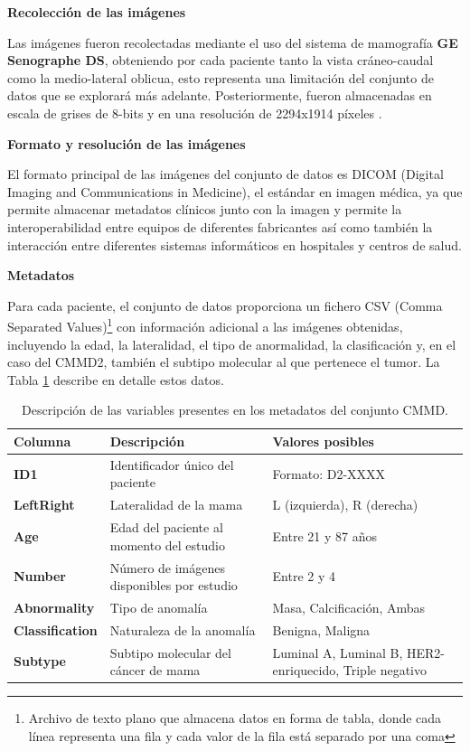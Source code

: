 \documentclass[a4paper,10pt]{book}
\begin{document}
\textbf{Recolección de las imágenes}

Las imágenes fueron recolectadas mediante el uso del sistema de mamografía \textbf{GE Senographe DS}, obteniendo por cada paciente tanto la vista cráneo-caudal como la medio-lateral oblicua, esto representa una limitación del conjunto de datos que se explorará más adelante. Posteriormente, fueron almacenadas en escala de grises de 8-bits y en una resolución de 2294x1914 píxeles \cite{cai_online_2023}.

\textbf{Formato y resolución de las imágenes}

El formato principal de las imágenes del conjunto de datos es DICOM (Digital Imaging and Communications in Medicine), el estándar en imagen médica, ya que permite almacenar metadatos clínicos junto con la imagen y permite la interoperabilidad entre equipos de diferentes fabricantes así como también la interacción entre diferentes sistemas informáticos en hospitales y centros de salud.

\textbf{Metadatos}

Para cada paciente, el conjunto de datos proporciona un fichero CSV (Comma Separated Values)\footnote{Archivo de texto plano que almacena datos en forma de tabla, donde cada línea representa una fila y cada valor de la fila está separado por una coma} con información adicional a las imágenes obtenidas, incluyendo la edad, la lateralidad, el tipo de anormalidad, la clasificación  y, en el caso del CMMD2, también el subtipo molecular al que pertenece el tumor. La Tabla \ref{tab:cmmd2_metadata} describe en detalle estos datos.


\begin{table}[h]
    \centering
    \begin{tabular}{>{\bfseries}l p{5cm} p{6cm}}
        \toprule
        \textbf{Columna} & \textbf{Descripción} & \textbf{Valores posibles} \\
        \midrule
        ID1 & Identificador único del paciente & Formato: D2-XXXX \\
        LeftRight & Lateralidad de la mama & L (izquierda), R (derecha) \\
        Age & Edad del paciente al momento del estudio & Entre 21 y 87 años \\
        Number & Número de imágenes disponibles por estudio & Entre 2 y 4 \\
        Abnormality & Tipo de anomalía & Masa, Calcificación, Ambas \\
        Classification & Naturaleza de la anomalía & Benigna, Maligna \\
        Subtype & Subtipo molecular del cáncer de mama & Luminal A, Luminal B, HER2-enriquecido, Triple negativo \\
        \bottomrule
    \end{tabular}
    \caption{Descripción de las variables presentes en los metadatos del conjunto CMMD.}
    \label{tab:cmmd2_metadata}
\end{table}
\end{document}
